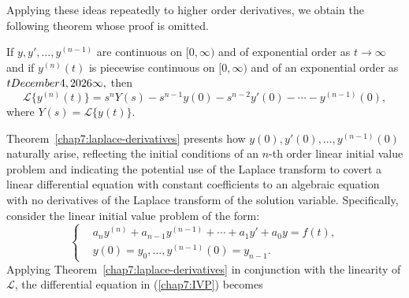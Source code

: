 Applying these ideas repeatedly to  higher order derivatives, we obtain the following theorem whose proof is omitted.
\begin{theorem}\label{chap7:laplace-derivatives}
If \( y, y', \ldots, y^{(n-1)} \) are continuous on \([0, \infty)\) and  of exponential order as $t\to\infty$ and if 
\( y^{(n)}(t) \) is piecewise continuous on \([0, \infty)\) and of an exponential order as $t\today\infty,
$ then
\[
\mathscr{L}\{y^{(n)}(t)\} = s^n Y(s) - s^{n-1}y(0) - s^{n-2}y'(0) - \cdots - y^{(n-1)}(0),
\]
where \( Y(s) = \mathscr{L}\{y(t)\} \).
\end{theorem}

Theorem~\ref{chap7:laplace-derivatives} presents how \( y(0),y'(0), \dots, y^{(n-1)}(0) \) naturally arise, reflecting the initial conditions of an \( n \)-th order linear initial value problem and indicating the potential use of the Laplace transform to covert a linear differential equation with constant coefficients to an algebraic equation with no derivatives of the Laplace transform of the solution variable. 
Specifically, consider the linear initial value problem of the form:
\begin{equation}\label{chap7:IVP}
	\begin{cases}
	&a_n y^{(n)} + a_{n-1}y^{(n-1)}+ \cdots+a_1y'+a_0 y = f(t),\\
	&y(0) = y_0, \dots, y^{(n-1)}(0)= y_{n-1}.
\end{cases}
\end{equation}
Applying Theorem~\ref{chap7:laplace-derivatives} in conjunction with the linearity of $\mathscr{L}$, the differential equation in (\ref{chap7:IVP}) becomes

